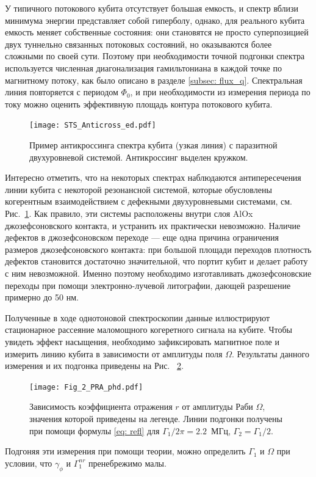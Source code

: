 У типичного потокового кубита отсутствует большая емкость, и спектр вблизи минимума энергии представляет собой гиперболу, однако, для реального кубита емкость меняет собственные состояния: они становятся не просто суперпозицией двух туннельно связанных потоковых состояний, но оказываются более сложными по своей сути. Поэтому при необходимости точной подгонки спектра используется численная диагонализация гамильтониана в каждой точке по магнитному потоку, как было описано в разделе \ref{subsec: flux_q}. Спектральная линия повторяется с периодом $\Phi_0$, и при необходимости из измерения периода по току можно оценить эффективную площадь контура потокового кубита. 

\begin{figure}[tbh]\centering
	\texttt{[image: STS\_Anticross\_ed.pdf]} \hfill
	\caption[Взаимодействие кубита с резонансной двухуровневой системой]{Пример антикроссинга спектра кубита (узкая линия) с паразитной двухуровневой системой. Антикроссинг выделен кружком.} 
	\label{img: anticross}
\end{figure}

Интересно отметить, что на некоторых спектрах наблюдаются антипересечения линии кубита с некоторой резонансной системой, которые обусловлены когерентным взаимодействием с дефекными двухуровневыми системами, см. Рис.~\ref{img: anticross}. Как правило, эти системы расположены внутри слоя AlOx джозефсоновского контакта, и устранить их практически невозможно. Наличие дефектов в джозефсоновском переходе --- еще одна причина ограничения размеров джозефсоновского контакта: при большой площади переходов плотность дефектов становится достаточно значительной, что портит кубит и делает работу с ним невозможной. Именно поэтому необходимо изготавливать джозефсоновские переходы при помощи электронно-лучевой литографии, дающей разрешение примерно до 50 нм. 

Полученные в ходе однотоновой спектроскопии данные иллюстрируют стационарное рассеяние маломощного когеретного сигнала на кубите. Чтобы увидеть эффект насыщения, необходимо зафиксировать магнитное поле и измерить линию кубита в зависимости от амплитуды поля $\Omega$. Результаты данного измерения и их подгонка приведены на Рис.~ \ref{img: power_line}. 
\begin{figure}
	\centering
	\texttt{[image: Fig\_2\_PRA\_phd.pdf]} \hfill
	\caption[Насыщение резонансной флуоресценции на кубите]{Зависимость коэффициента отражения $r$ от амплитуды Раби $\Omega$, значения которой приведены на легенде. Линии подгонки получены при помощи формулы \eqref{eq: refl} для $\Gamma_1/2\pi = 2.2$~МГц, $\Gamma_2=\Gamma_1/2$.}
	\label{img: power_line}
\end{figure}
Подгоняя эти измерения при помощи теории, можно определить $\Gamma_1$ и $\Omega$ при условии, что $\gamma_\phi$ и $\Gamma_1^{nr}$ пренебрежимо малы.

